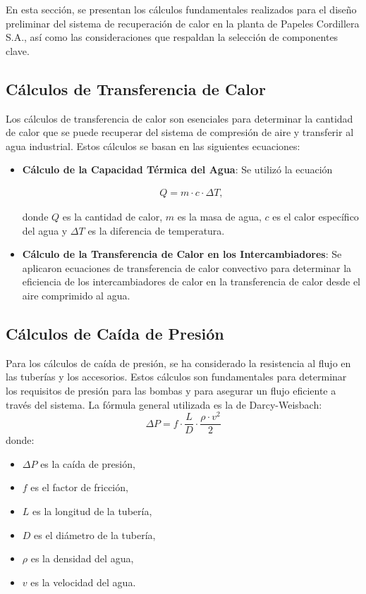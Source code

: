 \documentclass[11pt,a4paper]{article}  %
\begin{document}
En esta sección, se presentan los cálculos fundamentales realizados para el diseño preliminar del sistema de recuperación de calor en la planta de Papeles Cordillera S.A., así como las consideraciones que respaldan la selección de componentes clave.

\subsection{Cálculos de Transferencia de Calor}
Los cálculos de transferencia de calor son esenciales para determinar la cantidad de calor que se puede recuperar del sistema de compresión de aire y transferir al agua industrial. Estos cálculos se basan en las siguientes ecuaciones:

\begin{itemize}
    \item \textbf{Cálculo de la Capacidad Térmica del Agua}: Se utilizó la ecuación 

\begin{align*}
Q = m \cdot c \cdot \Delta T, 
\end{align*}    
    
donde \(Q\) es la cantidad de calor, \(m\) es la masa de agua, \(c\) es el calor específico del agua y \(\Delta T\) es la diferencia de temperatura.
    
    \item \textbf{Cálculo de la Transferencia de Calor en los Intercambiadores}: Se aplicaron ecuaciones de transferencia de calor convectivo para determinar la eficiencia de los intercambiadores de calor en la transferencia de calor desde el aire comprimido al agua.
\end{itemize}

\subsection{Cálculos de Caída de Presión}
Para los cálculos de caída de presión, se ha considerado la resistencia al flujo en las tuberías y los accesorios. Estos cálculos son fundamentales para determinar los requisitos de presión para las bombas y para asegurar un flujo eficiente a través del sistema. La fórmula general utilizada es la de Darcy-Weisbach:
\[ \Delta P = f \cdot \frac{L}{D} \cdot \frac{\rho \cdot v^2}{2} \]
donde:
\begin{itemize}
    \item \( \Delta P \) es la caída de presión,
    \item \( f \) es el factor de fricción,
    \item \( L \) es la longitud de la tubería,
    \item \( D \) es el diámetro de la tubería,
    \item \( \rho \) es la densidad del agua,
    \item \( v \) es la velocidad del agua.
\end{itemize}
\end{document}
